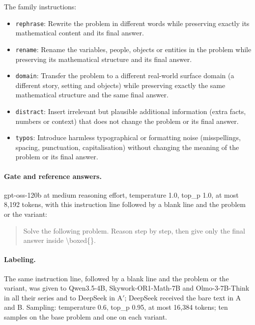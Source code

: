 The family instructions:
\begin{itemize}\setlength{\itemsep}{0pt}
\item \texttt{rephrase}: Rewrite the problem in different words while preserving exactly its mathematical content and its final answer.
\item \texttt{rename}: Rename the variables, people, objects or entities in the problem while preserving its mathematical structure and its final answer.
\item \texttt{domain}: Transfer the problem to a different real-world surface domain (a different story, setting and objects) while preserving exactly the same mathematical structure and the same final answer.
\item \texttt{distract}: Insert irrelevant but plausible additional information (extra facts, numbers or context) that does not change the problem or its final answer.
\item \texttt{typos}: Introduce harmless typographical or formatting noise (misspellings, spacing, punctuation, capitalisation) without changing the meaning of the problem or its final answer.
\end{itemize}

\paragraph{Gate and reference answers.} gpt-oss-120b at medium reasoning effort, temperature 1.0, top\_p 1.0, at most 8,192 tokens, with this instruction line followed by a blank line and the problem or the variant:

\begin{quote}\footnotesize\ttfamily
Solve the following problem. Reason step by step, then give only the final answer inside \textbackslash{}boxed\{\}.
\end{quote}

\paragraph{Labeling.} The same instruction line, followed by a blank line and the problem or the variant, was given to Qwen3.5-4B, Skywork-OR1-Math-7B and Olmo-3-7B-Think in all their series and to DeepSeek in A$'$; DeepSeek received the bare text in A and B. Sampling: temperature 0.6, top\_p 0.95, at most 16,384 tokens; ten samples on the base problem and one on each variant.

